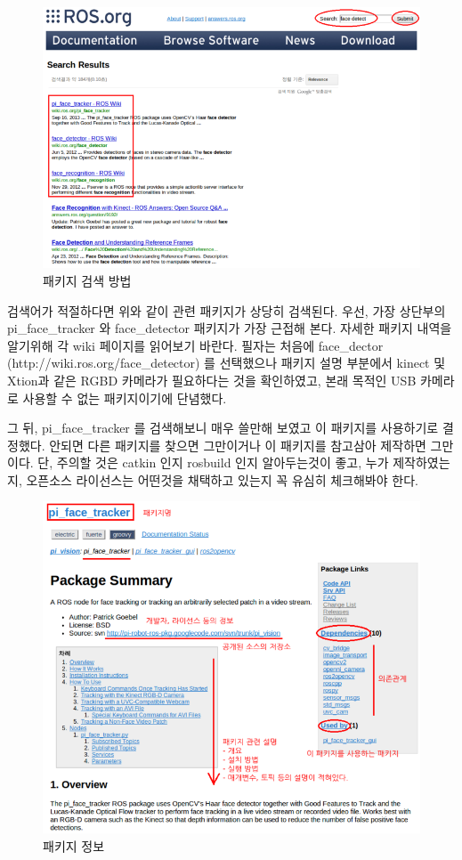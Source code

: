 \begin{figure}[h]
\centering\includegraphics[width=0.9\columnwidth]{pictures/chapter8/openpkg2.png}
\caption{패키지 검색 방법}
\end{figure}

검색어가 적절하다면 위와 같이 관련 패키지가 상당히 검색된다.  우선, 가장 상단부의 pi\_face\_tracker 와 face\_detector 패키지가 가장 근접해 본다. 자세한 패키지 내역을 알기위해 각 wiki 페이지를 읽어보기 바란다. 필자는 처음에 face\_dector (http://wiki.ros.org/face\_detector) 를 선택했으나 패키지 설명 부분에서 kinect 및 Xtion과 같은 RGBD 카메라가 필요하다는 것을 확인하였고, 본래 목적인 USB 카메라로 사용할 수 없는 패키지이기에 단념했다.

그 뒤, pi\_face\_tracker 를 검색해보니 매우 쓸만해 보였고 이 패키지를 사용하기로 결정했다. 안되면 다른 패키지를 찾으면 그만이거나 이 패키지를 참고삼아 제작하면 그만이다. 단, 주의할 것은 catkin 인지 rosbuild 인지 알아두는것이 좋고, 누가 제작하였는지, 오픈소스 라이선스는 어떤것을 채택하고 있는지 꼭 유심히 체크해봐야 한다.

\begin{figure}[h]
\centering\includegraphics[width=0.9\columnwidth]{pictures/chapter8/openpkg3.png}
\caption{패키지 정보}
\end{figure}

